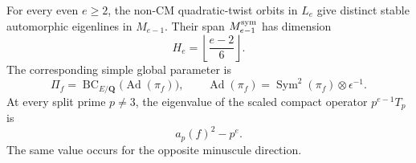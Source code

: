 \begin{theorem}
For every even $e\geq2$, the non-CM quadratic-twist orbits
in $L_e$ give distinct stable automorphic eigenlines in
$M_{e-1}$.  Their span $M_{e-1}^{\rm sym}$ has dimension
\[
                 H_e=\left\lfloor\frac{e-2}{6}\right\rfloor.
                                                               \tag{KT-S.2}
\]
The corresponding simple global parameter is
\[
 \Pi_f=\operatorname{BC}_{E/\mathbf Q}
             \bigl(\operatorname{Ad}(\pi_f)\bigr),
 \qquad
 \operatorname{Ad}(\pi_f)
       =\operatorname{Sym}^2(\pi_f)\otimes\epsilon^{-1}.
                                                               \tag{KT-S.3}
\]
At every split prime $p\ne3$, the eigenvalue of the scaled
compact operator $p^{e-1}T_p$ is
\[
                   a_p(f)^2-p^e.                              \tag{KT-S.4}
\]
The same value occurs for the opposite minuscule direction.
\end{theorem}
